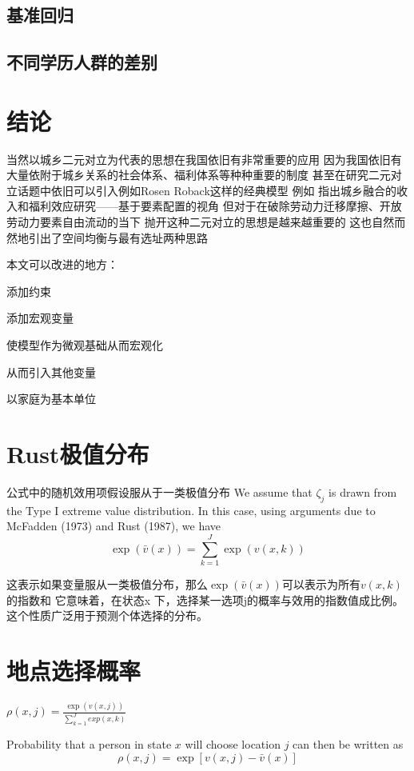 \documentclass[a4paper,10pt]{article}
\begin{document}
\subsection{基准回归} %
\label{sub:基准回归}



\subsection{不同学历人群的差别} %
\label{sub:不同学历人群的差别}




\section{结论}
当然以城乡二元对立为代表的思想在我国依旧有非常重要的应用 因为我国依旧有大量依附于城乡关系的社会体系、福利体系等种种重要的制度
甚至在研究二元对立话题中依旧可以引入例如Rosen Roback这样的经典模型
例如 
\cite{GuoDongMeiChengXiangRongHeDeShouRuHeFuLiXiaoYingYanJiuJiYuYaoSuPeiZhiDeShiJiao2023}指出城乡融合的收入和福利效应研究——基于要素配置的视角
但对于在破除劳动力迁移摩擦、开放劳动力要素自由流动的当下
抛开这种二元对立的思想是越来越重要的
这也自然而然地引出了空间均衡与最有选址两种思路

本文可以改进的地方：

添加约束

添加宏观变量

使模型作为微观基础从而宏观化

从而引入其他变量

以家庭为基本单位

\newpage
\appendix
\section{Rust极值分布}
公式中的随机效用项假设服从于一类极值分布
We assume that $\zeta_j$ is drawn from the Type I extreme value distribution. In this case, using arguments due to McFadden (1973) and Rust (1987), we have
$$\exp\left(\bar{v}(x)\right) = \sum_{k=1}^J \exp\left(v(x, k)\right)$$

这表示如果变量服从一类极值分布，那么$\exp\left(\bar{v}(x)\right)$可以表示为所有$v(x, k)$的指数和
它意味着，在状态x 下，选择某一选项j的概率与效用的指数值成比例。
这个性质广泛用于预测个体选择的分布。

\section{地点选择概率}
$\rho(x,j)=\frac{\exp(v(x,j))}{\sum\limits_{k=1}^{J} exp(x,k)}$

Probability that a person in state $x$ will choose location $j$ can then be written as
$$\rho(x,j)=\exp[v(x,j)-\bar v(x)]$$



\newpage


\end{document}
